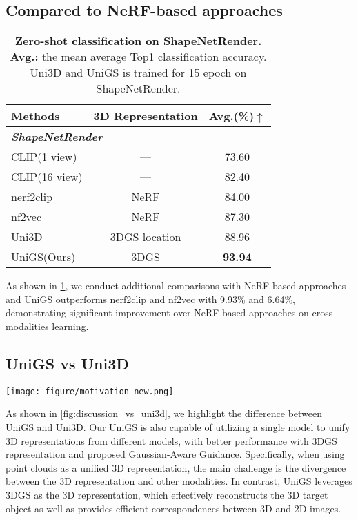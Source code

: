\subsection{Compared to NeRF-based approaches}
\begin{table}
		\centering
  \addtolength{\tabcolsep}{-2pt}
 \begin{tabular}{ l | c c}
\toprule
Methods & 3D Representation & Avg.(\%)$\uparrow$ \\
 \midrule  \midrule
    \multicolumn{3}{l}{\textit{\textbf{ShapeNetRender}}} \\
    \midrule
CLIP(1 view) & --- & 73.60 \\
CLIP(16 view) & --- & 82.40 \\
nerf2clip & NeRF & 84.00 \\
nf2vec & NeRF & 87.30 \\
Uni3D & 3DGS location & 88.96 \\
\midrule
\rowcolor{mygray}UniGS(Ours) & 3DGS & \textbf{93.94} \\
\bottomrule
\end{tabular}

		\caption{\textbf{Zero-shot classification on ShapeNetRender. Avg.: } the mean average Top1 classification accuracy. Uni3D and UniGS is trained for 15 epoch on ShapeNetRender. }
        \label{tab:discussion_nerf_comparison}
\end{table}

As shown in \cref{tab:discussion_nerf_comparison}, we conduct additional comparisons with NeRF-based approaches and UniGS outperforms nerf2clip\citep{ballerini2024connecting} and nf2vec\citep{ramirez2023deep} with 9.93\% and 6.64\%, demonstrating significant improvement over NeRF-based approaches on cross-modalities learning.

\subsection{UniGS vs Uni3D}
\begin{figure*}[h]
    \centerline{\texttt{[image: figure/motivation\_new.png]}}
    \caption{\textbf{Left:} Uni3D, using 3D point clouds for text-image-3D pre-training. \textbf{Middle}: our \name{}, leveraging 3DGS as the 3D representation with better alignment with image modality. \textbf{Right:} our \name{} learns a more general and stronger multi-modal representation.}
    \label{fig:discussion_vs_uni3d}
\end{figure*}
As shown in \cref{fig:discussion_vs_uni3d}, we highlight the difference between UniGS and Uni3D. Our UniGS is also capable of utilizing a single model to unify 3D representations from different models, with better performance with 3DGS representation and proposed Gaussian-Aware Guidance.
Specifically, when using point clouds as a unified 3D representation, the main challenge is the divergence between the 3D representation and other modalities. 
In contrast, UniGS leverages 3DGS as the 3D representation, which effectively reconstructs the 3D target object as well as provides efficient correspondences between 3D and 2D images.


